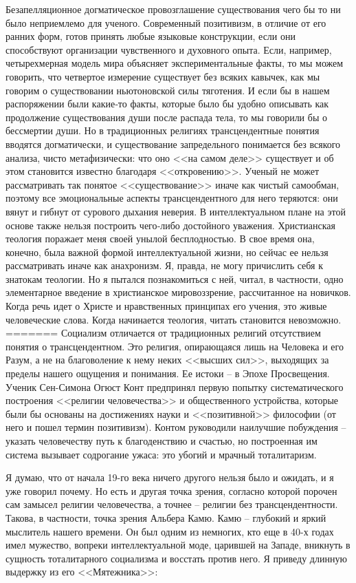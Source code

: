 \documentclass{book}
\begin{document}
Безапелляционное догматическое провозглашение существования чего бы то ни было неприемлемо для ученого. Современ­ный позитивизм, в отличие от его ранних форм, готов принять любые языковые конструкции, если они способствуют организации чувственного и духовного опыта. Если, например, четырехмерная модель мира объясняет экспериментальные факты, то мы можем говорить, что четвертое измерение существует без всяких кавычек, как мы говорим о существовании ньютоновской силы тяготения. И если бы в нашем распоряжении были какие‑то факты, которые было бы удобно описывать как продолжение существования души после распада тела, то мы говорили бы о бессмертии души. Но в традиционных религиях трансцендентные понятия вводятся догматически, и существование запредельного понимается без всякого анализа, чисто метафизически: что оно <<на самом деле>> существует и об этом становится известно благодаря <<откровению>>. Уче­ный не может рассматривать так понятое <<существование>> иначе как чистый самообман, поэтому все эмоциональные ас­пекты трансцендентного для него теряются: они вянут и гибнут от сурового дыхания неверия. В интеллектуальном плане на этой основе также нельзя построить чего‑либо достойного уважения. Христианская теология поражает меня своей уны­лой бесплодностью. В свое время она, конечно, была важной формой интеллектуальной жизни, но сейчас ее нельзя рассматривать иначе как анахронизм. Я, правда, не могу причислить себя к знатокам теологии. Но я пытался познакомиться с ней, читал, в частности, одно элементарное введение в христианское мировоззрение, рассчитанное на новичков. Когда речь идет о Христе и нравственных принципах его учения, это живые человеческие слова. Когда начинается теология, читать стано­вится невозможно.
=======
Социализм отличается от традиционных религий отсутствием понятия о трансцендентном. Это религия, опирающаяся лишь на Человека и его Разум, а не на благоволение к нему неких <<высших сил>>, выходящих за пределы нашего ощущения и понимания. Ее истоки -- в Эпохе Просвещения. Ученик Сен-Симона Огюст Конт предпринял первую попытку системати­ческого построения <<религии человечества>> и общественного устройства, которые были бы основаны на достижениях науки и <<позитивной>> философии (от него и пошел термин позитивизм).  Контом руководили наилучшие побуждения -- указать человечеству путь к благоденствию и счастью, но построенная им система вызывает содрогание ужаса: это убогий и мрачный тоталитаризм.

Я думаю, что от начала 19-го века ничего другого нельзя было и ожидать, и я уже говорил почему. Но есть и другая точка зрения, согласно которой порочен сам замысел религии человечества, а точнее -- религии без трансцендентности. Такова, в частности, точка зрения Альбера Камю. Камю -- глубокий и яркий мыслитель нашего времени. Он был одним из немногих, кто еще в 40-х годах имел мужество, вопреки интеллектуальной моде, царившей на Западе, вникнуть в сущность тоталитарного социализма и восстать против него. Я приведу длинную выдержку из его <<Мятежника>>:
\end{document}
